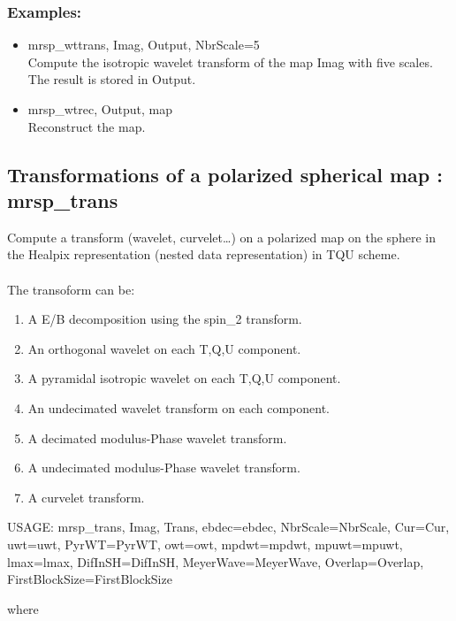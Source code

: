 \subsubsection*{Examples:} 
\begin{itemize}
\item mrsp\_wttrans, Imag, Output, NbrScale=5 \\
Compute the isotropic wavelet transform of the map Imag with five scales. The result is stored in Output.
\item mrsp\_wtrec, Output, map \\
Reconstruct the map. 
\end{itemize}



\subsection{Transformations of a polarized spherical map : mrsp\_trans}
Compute a transform (wavelet, curvelet\ldots) on a polarized map on the sphere in the Healpix representation (nested data representation) in TQU scheme.\\ \\
The transoform can be:
\begin{enumerate}
\item A E/B decomposition using the spin\_2 transform.
\item An orthogonal wavelet on each T,Q,U component.
\item A pyramidal isotropic wavelet on each T,Q,U component.
\item An undecimated wavelet transform on each component.
\item A decimated modulus-Phase wavelet transform.
\item A undecimated modulus-Phase wavelet transform.
\item A curvelet transform.
\end{enumerate}
{\bf
\begin{center}
     USAGE: mrsp\_trans, Imag, Trans, ebdec=ebdec, NbrScale=NbrScale, Cur=Cur, uwt=uwt, PyrWT=PyrWT, owt=owt, mpdwt=mpdwt, mpuwt=mpuwt, 
     lmax=lmax, DifInSH=DifInSH, MeyerWave=MeyerWave, Overlap=Overlap, FirstBlockSize=FirstBlockSize
\end{center}}
where
